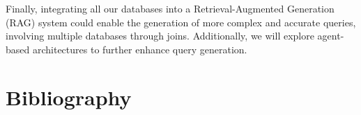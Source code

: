 \documentclass[12pt,a4paper]{article}
\begin{document}
Finally, integrating all our databases into a Retrieval-Augmented Generation (RAG) system could enable the generation of more complex and accurate queries, involving multiple databases through joins. Additionally, we will explore agent-based architectures to further enhance query generation.

\section*{Bibliography}


\end{document}
